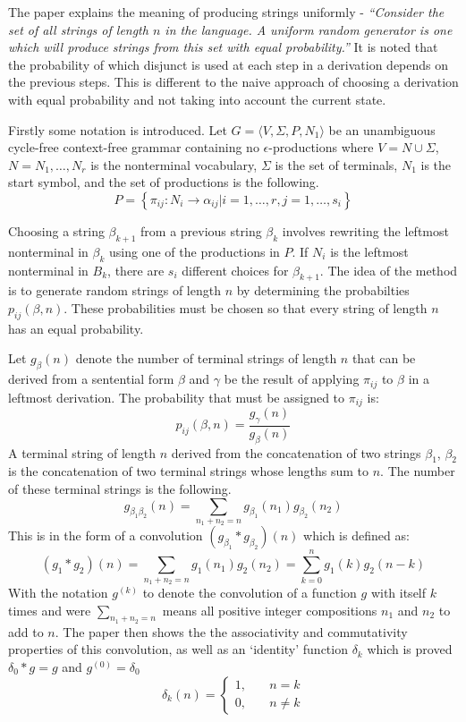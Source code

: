  The paper explains the meaning of producing strings uniformly - \emph{``Consider the set of all strings of length $n$ in the language. A uniform random generator is one which will produce strings from this set with equal probability.''} It is noted that the probability of which disjunct is used at each step in a derivation depends on the previous steps. This is different to the naive approach of choosing a derivation with equal probability and not taking into account the current state.

  Firstly some notation is introduced. Let $G = \langle V, \Sigma, P, N_1 \rangle$ be an unambiguous cycle-free context-free grammar containing no $\epsilon$-productions where $V = N \cup \Sigma$, $N = {N_1,\dots,N_r}$ is the nonterminal vocabulary, $\Sigma$ is the set of terminals, $N_1$ is the start symbol, and the set of productions is the following.
  \[P = \left\{\pi_{ij} : N_i \to \alpha_{ij} | i = 1,\dots,r, j = 1, \dots,s_i \right\}\]

  Choosing a string $\beta_{k+1}$ from a previous string $\beta_k$ involves rewriting the leftmost nonterminal in $\beta_k$ using one of the productions in $P$. If $N_i$ is the leftmost nonterminal in $B_k$, there are $s_i$ different choices for $\beta_{k+1}$. The idea of the method is to generate random strings of length $n$ by determining the probabilties $p_{ij}(\beta, n)$. These probabilities must be chosen so that every string of length $n$ has an equal probability.

  Let $g_\beta(n)$ denote the number of terminal strings of length $n$ that can be derived from a sentential form $\beta$ and $\gamma$ be the result of applying $\pi_{ij}$ to $\beta$ in a leftmost derivation. The probability that must be assigned to $\pi_{ij}$ is:
  \[
  p_{ij}(\beta, n) = \frac{g_\gamma(n)}{g_\beta(n)}
  \]
  A terminal string of length $n$ derived from the concatenation of two strings $\beta_1$, $\beta_2$ is the concatenation of two terminal strings whose lengths sum to $n$. The number of these terminal strings is the following.
  \[
  g_{\beta_1\beta_2}(n) = \sum_{n_1+n_2=n}g_{\beta_1}(n_1)g_{\beta_2}(n_2)
  \]
  This is in the form of a convolution $(g_{\beta_1} * g_{\beta_2})(n)$ which is defined as:
  \[
  (g_1 * g_2)(n) = \sum_{n_1+n_2=n}g_1(n_1)g_2(n_2) = \sum_{k=0}^{n} g_1(k)g_2(n-k)
  \]
  With the notation $g^{(k)}$ to denote the convolution of a function $g$ with itself $k$ times and were $\sum_{n_1+n_2=n}$ means all positive integer compositions $n_1$ and $n_2$ to add to $n$. The paper then shows the the associativity and commutativity properties of this convolution, as well as an `identity' function $\delta_k$ which is proved $\delta_0 * g = g$ and $g^{(0)} = \delta_0$
  \[
  \delta_k(n) = \left\{\begin{aligned}
    1, \quad & n = k\\
    0, \quad & n \neq k
  \end{aligned}\right.
  \]


